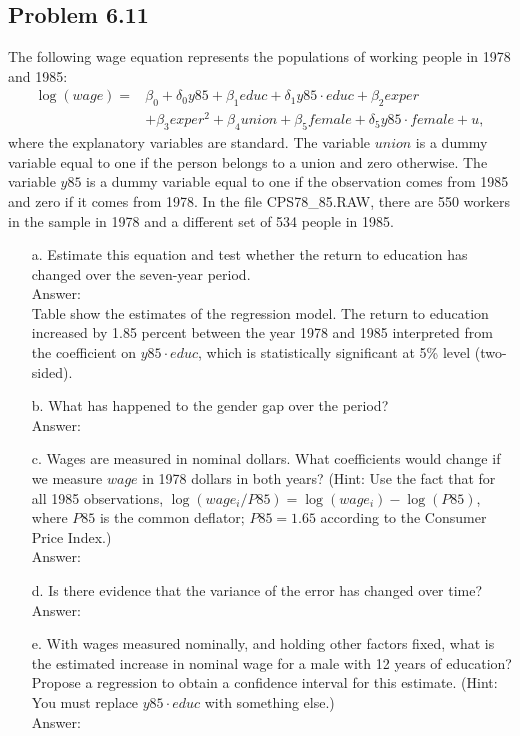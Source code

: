 \documentclass[10pt]{article}
\begin{document}
\subsection*{Problem 6.11}
The following wage equation represents the populations of working people in 1978 and 1985:
\begin{align*}
    \log(wage)=&\beta_0+ \delta_0 y85+\beta_1 educ+\delta_1 y85\cdot educ + \beta_2 exper \\
    &+\beta_3 exper^2 + \beta_4 union +\beta_5 female +\delta_5 y85\cdot female+u,
\end{align*}
where the explanatory variables are standard. The variable $union$ is a dummy variable equal to one if the person belongs to a union and zero otherwise. The variable $y85$ is a dummy variable equal to one if the observation comes from 1985 and zero if it comes from 1978. In the file CPS78\_85.RAW, there are 550 workers in the sample in 1978 and a different set of 534 people in 1985. 
\begin{enumerate}
\item[a.] Estimate this equation and test whether the return to education has changed over the seven-year period.
\\ Answer: \\
Table show the estimates of the regression model. The return to education increased by 1.85 percent between the year 1978 and 1985 interpreted from the coefficient on $y85\cdot educ$, which is statistically significant at 5\% level (two-sided). 
\item[b.] What has happened to the gender gap over the period? 
\\ Answer: \\

\item[c.] Wages are measured in nominal dollars. What coefficients would change if we measure $wage$ in 1978 dollars in both years? (Hint: Use the fact that for all 1985 observations, $\log(wage_i/P85)=\log(wage_i)-\log(P85)$, where $P85$ is the common deflator; $P85=1.65$ according to the Consumer Price Index.)
\\ Answer: \\

\item[d.] Is there evidence that the variance of the error has changed over time?
\\ Answer: \\

\item[e.] With wages measured nominally, and holding other factors fixed, what is the estimated increase in nominal wage for a male with 12 years of education? Propose a regression to obtain a confidence interval for this estimate. (Hint: You must replace $y85\cdot educ$ with something else.)
\\ Answer: \\
 
\end{enumerate}
\end{document}
